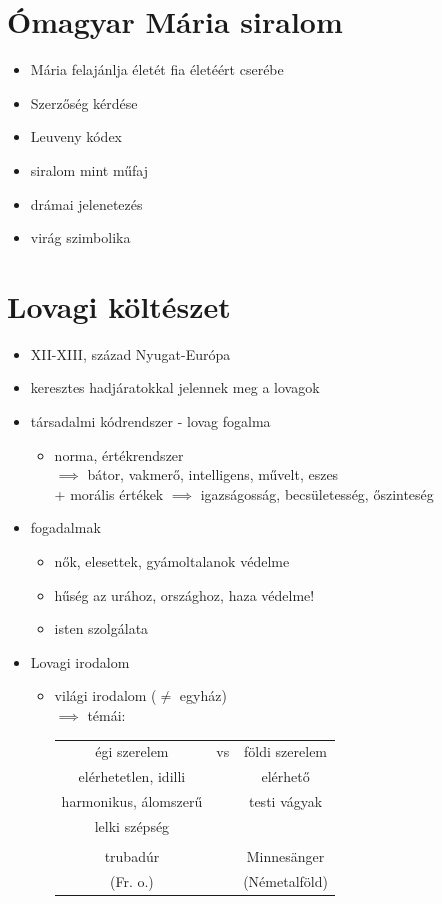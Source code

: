 \documentclass{article}
\begin{document}
\section{Ómagyar Mária siralom}
\begin{itemize}
    \item Mária felajánlja életét fia életéért cserébe
    \item Szerzőség kérdése
    \item Leuveny kódex
    \item siralom mint műfaj
    \item drámai jelenetezés
    \item virág szimbolika 
\end{itemize}

\section{Lovagi költészet}
\begin{itemize}
    \item XII-XIII, század Nyugat-Európa
    \item keresztes hadjáratokkal jelennek meg a lovagok
    \item társadalmi kódrendszer - lovag fogalma \begin{itemize}
        \item norma, értékrendszer \\ $\implies$ bátor, vakmerő, intelligens, művelt, eszes \\ + morális értékek $\implies$ igazságosság, becsületesség, őszinteség
    \end{itemize}
    \item fogadalmak \begin{itemize}
        \item nők, elesettek, gyámoltalanok védelme
        \item hűség az urához, országhoz, haza védelme!
        \item isten szolgálata
    \end{itemize}
    \item Lovagi irodalom \begin{itemize}
        \item világi irodalom ($\neq$ egyház) \\ $\implies$ témái: \\
        \begin{tabular}{c c c}
             égi szerelem & vs & földi szerelem  \\
             elérhetetlen, idilli & & elérhető \\ harmonikus, álomszerű & & testi vágyak \\lelki szépség & & \\
             \\
             trubadúr & & Minnesänger \\
            (Fr. o.) & & (Németalföld)
             
        \end{tabular}
    \end{itemize}
\end{itemize}
\end{document}

